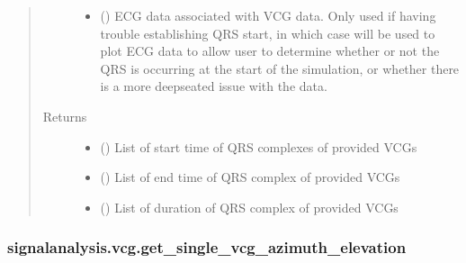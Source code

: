 \documentclass[letterpaper,10pt,english]{sphinxmanual}
\begin{document}
\begin{fulllineitems}
\begin{quote}
\begin{description}
\begin{itemize}
\item {} 
\sphinxAtStartPar
{} (\sphinxstyleliteralemphasis{\sphinxupquote{, }}) \textendash{} ECG data associated with VCG data. Only used if having trouble establishing QRS start, in which case will be
used to plot ECG data to allow user to determine whether or not the QRS is occurring at the start of the
simulation, or whether there is a more deep\sphinxhyphen{}seated issue with the data.

\end{itemize}

\item[{Returns}] \leavevmode
\sphinxAtStartPar
\begin{itemize}
\item {} 
\sphinxAtStartPar
{} () \textendash{} List of start time of QRS complexes of provided VCGs

\item {} 
\sphinxAtStartPar
{} () \textendash{} List of end time of QRS complex of provided VCGs

\item {} 
\sphinxAtStartPar
{} () \textendash{} List of duration of QRS complex of provided VCGs

\end{itemize}


\end{description}\end{quote}

\end{fulllineitems}



\subsubsection{signalanalysis.vcg.get\_single\_vcg\_azimuth\_elevation}
\label{\detokenize{_autosummary/signalanalysis.vcg.get_single_vcg_azimuth_elevation:signalanalysis-vcg-get-single-vcg-azimuth-elevation}}\label{\detokenize{_autosummary/signalanalysis.vcg.get_single_vcg_azimuth_elevation::doc}}
\end{document}
